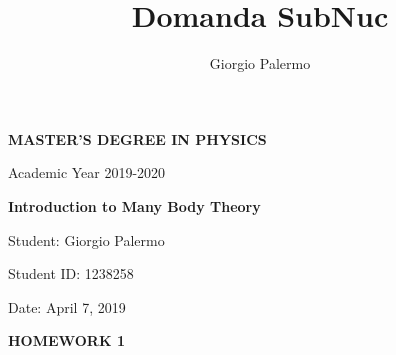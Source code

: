\documentclass[a4paper]{article}
\title{Domanda SubNuc}
\author{Giorgio Palermo}
\begin{document}
\hypersetup{linkcolor = black}
\hypersetup{linkcolor = blue}

\begin{center}
    \textbf{MASTER'S DEGREE IN PHYSICS}
    
    Academic Year 2019-2020
    
    \medskip
    \textbf{Introduction to Many Body Theory}
\end{center}

\vspace{0.8cm}
Student: Giorgio Palermo

Student ID: 1238258

Date: April 7, 2019

\bigskip

\begin{center}
\textbf{HOMEWORK 1}
\end{center}
\end{document}
